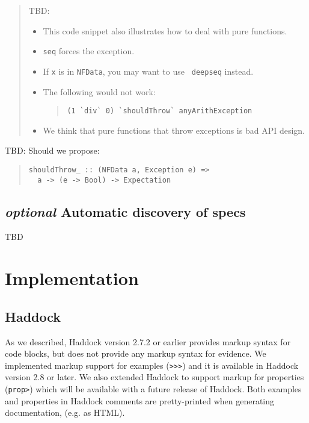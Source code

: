 \documentclass[preprint]{sigplanconf}
\begin{document}
\begin{quote}
    TBD:
    \begin{itemize}
        \item
            This code snippet also illustrates how to deal with pure
            functions.
        \item
            {\tt seq} forces the exception.
        \item
            If {\tt x} is in {\tt NFData}, you may want to use {\tt
            deepseq} instead.
        \item
            The following would not work:
\begin{quote}\small\begin{verbatim}
(1 `div` 0) `shouldThrow` anyArithException
\end{verbatim}\end{quote}
        \item
            We think that pure functions that throw exceptions is bad
            API design.
    \end{itemize}
\end{quote}

TBD: Should we propose:
\begin{quote}\small\begin{verbatim}
shouldThrow_ :: (NFData a, Exception e) =>
  a -> (e -> Bool) -> Expectation
\end{verbatim}\end{quote}

\subsection{\emph{optional} Automatic discovery of specs}
TBD


\section{Implementation}

\subsection{Haddock}

As we described, Haddock version 2.7.2 or earlier provides markup syntax for
code blocks, but does not provide any markup syntax for evidence.
We implemented markup support for examples ({\tt >>>}) and it is available in
Haddock version 2.8 or later.
We also extended Haddock to support markup for properties ({\tt prop>}) which
will be available with a future release of Haddock.
Both examples and properties in Haddock comments are pretty-printed when
generating documentation, (e.g. as HTML).
\end{document}

